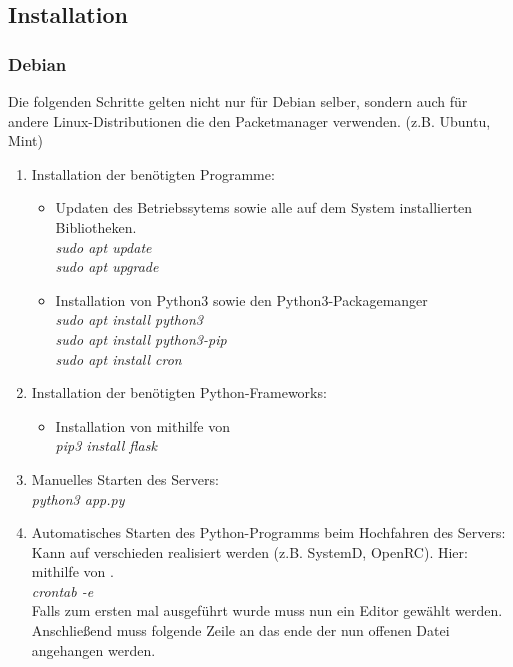 \documentclass{article}
\begin{document}
\subsection{Installation}
\subsubsection{Debian}
Die folgenden Schritte gelten nicht nur für Debian selber, sondern auch für andere 
Linux-Distributionen die den Packetmanager  verwenden. (z.B. Ubuntu, Mint)\par

\begin{enumerate}
    \item Installation der benötigten Programme: 
        \begin{itemize}
            \item Updaten des Betriebssytems sowie alle auf dem System 
                installierten Bibliotheken. \\
                \textit{sudo apt update} \\
                \textit{sudo apt upgrade}
            \item Installation von Python3 sowie den Python3-Packagemanger  \\
                \textit{sudo apt install python3} \\
                \textit{sudo apt install python3-pip}\\
                \textit{sudo apt install cron}
        \end{itemize}
    \item Installation der benötigten Python-Frameworks: 
        \begin{itemize}
            \item Installation von  mithilfe von  \\
                \textit{pip3 install flask}
        \end{itemize}
    \item Manuelles Starten des Servers: \\
        \textit{python3 app.py} 
    \item Automatisches Starten des Python-Programms beim Hochfahren des Servers: \\ 
        Kann auf verschieden realisiert werden (z.B. SystemD, OpenRC).
        Hier: mithilfe von .  \\
        \textit{crontab -e} \\ 
        Falls  zum ersten mal ausgeführt wurde muss nun ein Editor gewählt
        werden. Anschließend muss folgende Zeile an das ende der nun offenen Datei 
        angehangen werden. \\
\end{enumerate}
\end{document}
